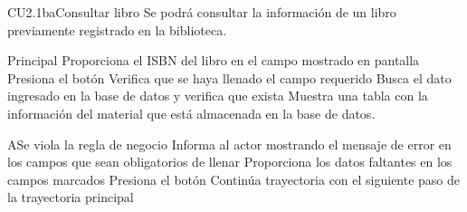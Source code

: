 \begin{UseCase}{CU2.1ba}{Consultar libro}{
	Se podrá consultar la información de un libro previamente registrado en la biblioteca.
}
\end{UseCase}


\begin{UCtrayectoria}{Principal}
		\UCpaso[\UCactor] Proporciona el ISBN del libro en el campo mostrado en pantalla 
		\UCpaso[\UCactor] Presiona el botón 
		\UCpaso[\UCsist] Verifica que se haya llenado el campo requerido 
		\UCpaso[\UCsist] Busca el dato ingresado en la base de datos  y verifica que exista 
		\UCpaso[\UCsist] Muestra una tabla con la información del material que está almacenada en la base de datos.
\end{UCtrayectoria}



\begin{UCtrayectoriaA}{A}{Se viola la regla de negocio }	
			\UCpaso[\UCsist] Informa al actor mostrando el mensaje de error  en los campos que sean obligatorios de llenar
			\UCpaso[\UCactor] Proporciona los datos faltantes en los campos marcados 
			\UCpaso[\UCactor] Presiona el botón 
			\UCpaso[\UCsist] Continúa trayectoria con el siguiente paso de la trayectoria principal 
\end{UCtrayectoriaA}

